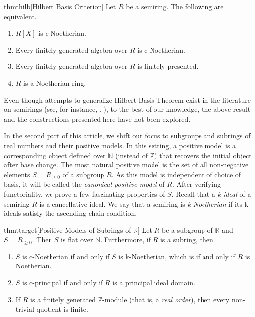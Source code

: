 \documentclass[notitlepage, 10pt]{article}
\theoremstyle{defin}
\theoremstyle{theo}
\theoremstyle{rema}
\newcommand{\R}{\mathbb{R}}
\newcommand{\N}{\mathbb{N}}
\newcommand{\Z}{\mathbb{Z}}
\begin{document}
\begin{restatable}{thm}{thilb}[Hilbert Basis Criterion]\label{thm1}
        Let $R$ be a semiring. The following are equivalent.
    \begin{enumerate}
        \item $R[X]$ is c-Noetherian.
        \item Every finitely generated algebra over $R$ is c-Noetherian.
        \item Every finitely generated algebra over $R$ is finitely presented.
        \item $R$ is a Noetherian ring. 
    \end{enumerate} 
\end{restatable}

Even though attempts to generalize Hilbert Basis Theorem exist in the literature on semirings (see, for instance, \cite{chen2026arithmeticsemiringsiideals}, \cite{allenhilb1980}), to the best of our knowledge, the above result and the constructions presented here have not been explored. 

In the second part of this article, we shift our focus to subgroups and subrings of real numbers and their positive models. In this setting, a positive model is a corresponding object defined over $\N$ (instead of $\Z$) that recovers the initial object after base change. The most natural positive model is the set of all non-negative elements $S=R_{\geq 0}$ of a subgroup $R$. As this model is independent of choice of basis, it will be called the \textit{canonical positive model} of $R$. After verifying functoriality, we prove a few fascinating properties of $S$. Recall that a \textit{k-ideal} of a semiring $R$ is a cancellative ideal. We say that a semiring is \textit{k-Noetherian} if its k-ideals satisfy the ascending chain condition. 

\begin{restatable}{thm}{ttarget}[Positive Models of Subrings of $\R$]\label{t:target}
    Let $R$ be a subgroup of $\R$ and $S=R_{\geq 0}$. Then $S$ is flat over $\N$. Furthermore, if $R$ is a subring, then
    \begin{enumerate}
        \item $S$ is c-Noetherian if and only if $S$ is k-Noetherian, which is if and only if $R$ is Noetherian.
        \item $S$ is c-principal if and only if $R$ is a principal ideal domain.
        \item If $R$ is a finitely generated $\Z$-module (that is, a \textit{real order}), then every non-trivial quotient is finite. 
    \end{enumerate}
\end{restatable}
\end{document}
